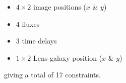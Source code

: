 \begin{itemize}
\item $4\times 2$ image positions ($x$ \& $y$)
\item 4 fluxes
\item 3 time delays
\item $1\times 2$ Lens galaxy position ($x$ \& $y$) 
\end{itemize}
giving a total of 17 constraints.